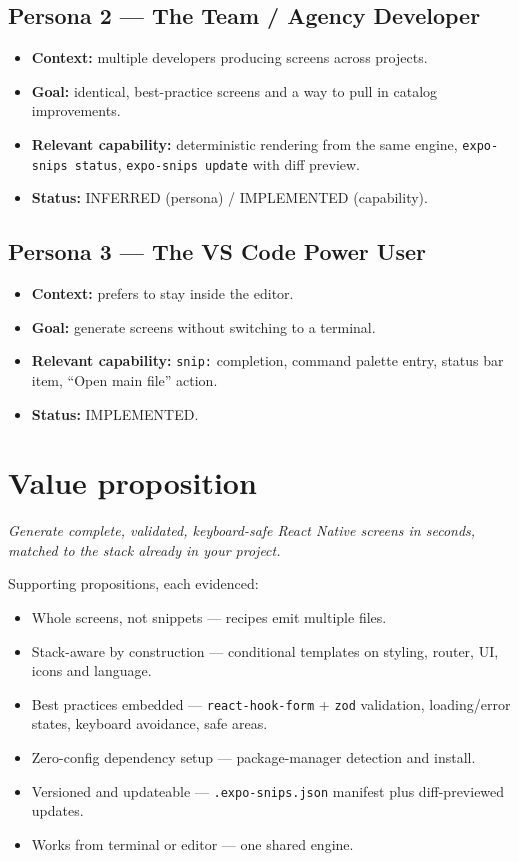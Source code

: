 \subsection*{Persona 2 --- The Team / Agency Developer}
\begin{itemize}
  \item \textbf{Context:} multiple developers producing screens across projects.
  \item \textbf{Goal:} identical, best-practice screens and a way to pull in
        catalog improvements.
  \item \textbf{Relevant capability:} deterministic rendering from the same
        engine, \texttt{expo-snips status}, \texttt{expo-snips update} with diff
        preview.
  \item \textbf{Status:} INFERRED (persona) / IMPLEMENTED (capability).
\end{itemize}

\subsection*{Persona 3 --- The VS Code Power User}
\begin{itemize}
  \item \textbf{Context:} prefers to stay inside the editor.
  \item \textbf{Goal:} generate screens without switching to a terminal.
  \item \textbf{Relevant capability:} \texttt{snip:} completion, command palette
        entry, status bar item, ``Open main file'' action.
  \item \textbf{Status:} IMPLEMENTED.
\end{itemize}

\section{Value proposition}

\emph{Generate complete, validated, keyboard-safe React Native screens in seconds,
matched to the stack already in your project.}

Supporting propositions, each evidenced:

\begin{itemize}
  \item Whole screens, not snippets --- recipes emit multiple files.
  \item Stack-aware by construction --- conditional templates on styling, router,
        UI, icons and language.
  \item Best practices embedded --- \texttt{react-hook-form} + \texttt{zod}
        validation, loading/error states, keyboard avoidance, safe areas.
  \item Zero-config dependency setup --- package-manager detection and install.
  \item Versioned and updateable --- \texttt{.expo-snips.json} manifest plus
        diff-previewed updates.
  \item Works from terminal or editor --- one shared engine.
\end{itemize}

